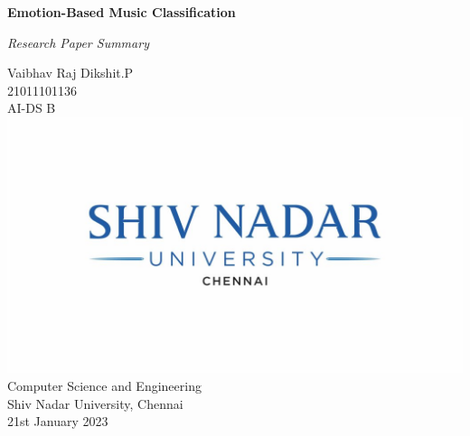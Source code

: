 \begin{titlepage}
    \centering
        \vspace*{2cm}
        \Huge
        \textbf{Emotion-Based Music Classification}
        
        \vspace*{0.6cm}
        \Large
        \textit{Research Paper Summary}
        
        \normalsize
        \vspace*{1.5cm}
        Vaibhav Raj Dikshit.P\\
        \vspace{0.2cm}
        21011101136\\
        \vspace{0.2cm}
        AI-DS B\\
        
        
        \includegraphics{logo3}\\
        Computer Science and Engineering\\
        Shiv Nadar University, Chennai\\
        21st January 2023
        \vspace*{1cm}
    
\end{titlepage}
